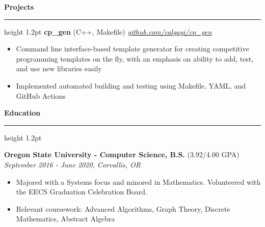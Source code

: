 \documentclass{article}
\def\hrulefill{\leavevmode\leaders\hrule height 1.2pt\hfill\kern\z}
\begin{document}
\noindent \large \textbf{Projects } \hrulefill
\vskip 0.1in
\noindent \normalsize \textbf{cp\_gen} \footnotesize (C++, Makefile) \hfill \small \textit{\href{https://github.com/calgagi/cp_gen}{github.com/calgagi/cp\_gen}}
\begin{itemize}
\item Command line interface-based template generator for creating competitive programming templates on the fly, with an emphasis on ability to add, test, and use new libraries easily
\item Implemented automated building and testing using Makefile, YAML, and GitHub Actions
\end{itemize}

\vskip 0.1in

\noindent \large \textbf{Education } \hrulefill
\vskip 0.1in

\noindent \normalsize \textbf{Oregon State University - Computer Science, B.S.} \footnotesize (3.92/4.00 GPA) \hfill \small \textit{September 2016 - June 2020, Corvallis, OR}
\begin{itemize}
\item Majored with a Systems focus and minored in Mathematics. Volunteered with the EECS Graduation Celebration Board.
\item Relevant coursework: Advanced Algorithms, Graph Theory, Discrete Mathematics, Abstract Algebra
\end{itemize}
\end{document}
